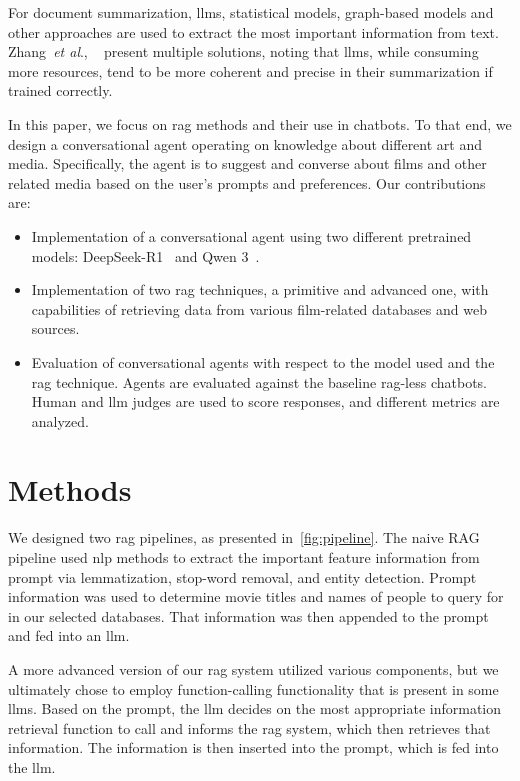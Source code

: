 \documentclass[fleqn,moreauthors,10pt]{ds_report}
\newcommand{\etal}{\textit{et al}., }
\begin{document}
For document summarization, \acp{llm}, statistical models, graph-based models and other approaches are used to extract the most important information from text. Zhang~\etal~\cite{summarization} present multiple solutions, noting that \acp{llm}, while consuming more resources, tend to be more coherent and precise in their summarization if trained correctly.

In this paper, we focus on \ac{rag} methods and their use in chatbots. To that end, we design a conversational agent operating on knowledge about different art and media. Specifically, the agent is to suggest and converse about films and other related media based on the user’s prompts and preferences. Our contributions are:

\begin{itemize}
\setlength\itemsep{-0.3em}
	\item Implementation of a conversational agent using two different pretrained models: DeepSeek-R1~\cite{deepseek3} and Qwen 3~\cite{qwen3}.
	\item Implementation of two \ac{rag} techniques, a primitive and advanced one, with capabilities of retrieving data from various film-related databases and web sources.
	\item Evaluation of conversational agents with respect to the model used and the \ac{rag} technique. Agents are evaluated against the baseline \ac{rag}-less chatbots. Human and \ac{llm} judges are used to score responses, and different metrics are analyzed.
\end{itemize}


\section*{Methods}

We designed two \ac{rag} pipelines, as presented in~\cref{fig:pipeline}. The naive RAG pipeline used \ac{nlp} methods to extract the important feature information from prompt via lemmatization, stop-word removal, and entity detection. Prompt information was used to determine movie titles and names of people to query for in our selected databases. That information was then appended to the prompt and fed into an \ac{llm}.

A more advanced version of our \ac{rag} system utilized various components, but we ultimately chose to employ function-calling functionality that is present in some \acp{llm}. Based on the prompt, the \ac{llm} decides on the most appropriate information retrieval function to call and informs the \ac{rag} system, which then retrieves that information. The information is then inserted into the prompt, which is fed into the \ac{llm}.
\end{document}
